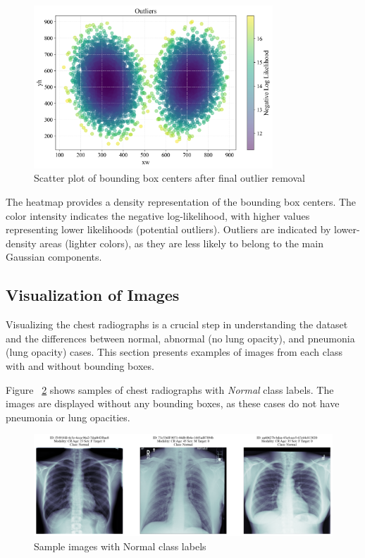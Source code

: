 \begin{figure}[H]
    \begin{center}
        \includegraphics[width = 0.8\textwidth]{figures/Figure22.png}
        \caption{Scatter plot of bounding box centers after final outlier removal}
        \label{fig:cha-2 figure19}
    \end{center}
\end{figure}

The heatmap provides a density representation of the bounding box centers. The color intensity indicates the negative log-likelihood, with higher values representing lower likelihoods (potential outliers). Outliers are indicated by lower-density areas (lighter colors), as they are less likely to belong to the main Gaussian components.

\subsection{Visualization of Images}
\label{subsec:chap2 section 1.6}

Visualizing the chest radiographs is a crucial step in understanding the dataset and the differences between normal, abnormal (no lung opacity), and pneumonia (lung opacity) cases. This section presents examples of images from each class with and without bounding boxes.

Figure ~\ref{fig:cha-2 figure20} shows samples of chest radiographs with \emph{Normal} class labels. The images are displayed without any bounding boxes, as these cases do not have pneumonia or lung opacities.

\begin{figure}[H]
    \begin{center}
        \includegraphics[width = \textwidth]{figures/Figure24.png}
        \caption{Sample images with Normal class labels}
        \label{fig:cha-2 figure20}
    \end{center}
\end{figure}

